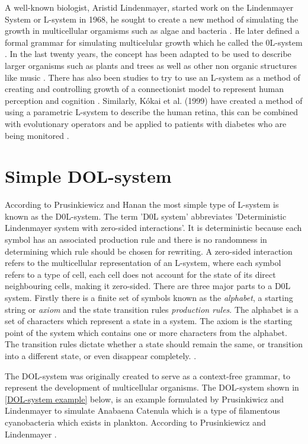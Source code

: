 A well-known biologist, Aristid Lindenmayer, started work on the Lindenmayer System or L-system in 1968, he sought to create a new method of simulating the growth in multicellular orgamisms such as algae and bacteria \cite{lindenmayer1968mathematical}. He later defined a formal grammar for simulating multicelular growth which he called the 0L-system \cite {lindenmayer1971developmental}. In the last twenty years, the concept has been adapted to be used to describe larger organisms such as plants and trees as well as other non organic structures like music \cite{worth2005growing}. There has also been studies to try to use an L-system as a method of creating and controlling growth of a connectionist model to represent human perception and cognition \cite{vaario1991connectionist}. Similarly, K{\'o}kai et al. (1999) have created a method of using a parametric L-system to describe the human retina, this can be combined with evolutionary operators and be applied to patients with diabetes who are being monitored \cite{kokai1999parametric}.


\section{Simple DOL-system} \label{Simple DOL-systems}

According to Prusinkiewicz and Hanan the most simple type of L-system is known as the D0L-system. The term 'D0L system' abbreviates 'Deterministic Lindenmayer system with zero-sided interactions'. It is deterministic because each symbol has an associated production rule and there is no randomness in determining which rule should be chosen for rewriting. A zero-sided interaction refers to the multicellular representation of an L-system, where each symbol refers to a type of cell, each cell does not account for the state of its direct neighbouring cells, making it zero-sided. There are three major parts to a D0L system. Firstly there is a finite set of symbols known as the \textit{alphabet}, a starting string or \textit{axiom} and the state transition rules \textit{production rules}. The alphabet is a set of characters which represent a state in a system. The axiom is the starting point of the system which contains one or more characters from the alphabet. The transition rules dictate whether a state should remain the same, or transition into a different state, or even disappear completely. \cite{prusinkiewicz2013lindenmayer}. 

The DOL-system was originally created to serve as a context-free grammar, to represent the development of multicellular organisms. The DOL-system shown in \ref{DOL-system example} below, is an example formulated by Prusinkiwicz and Lindenmayer to simulate Anabaena Catenula which is a type of filamentous cyanobacteria which exists in plankton. According to Prusinkiewicz and Lindenmayer  \cite{prusinkiewicz2012algorithmic}.

